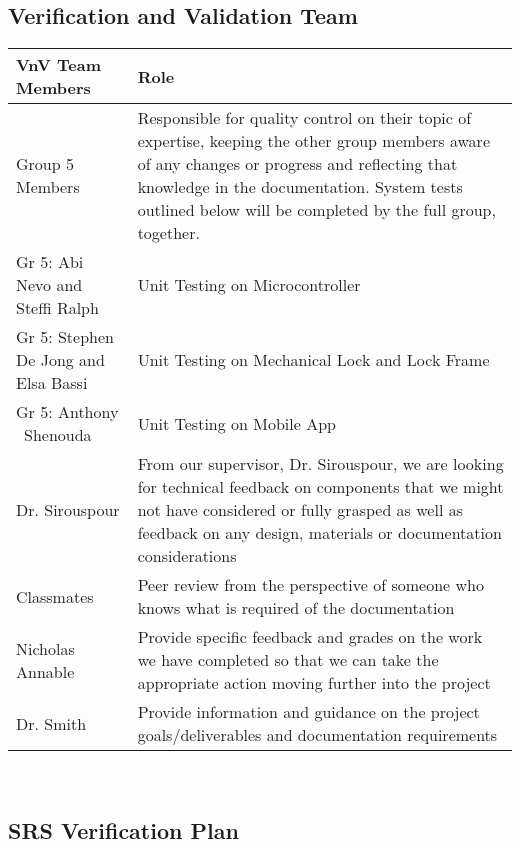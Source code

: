 \documentclass[12pt, titlepage]{article}
\begin{document}
\subsection{Verification and Validation Team}

 \begin{minipage}{\textwidth}
\renewcommand*{\arraystretch}{1.5}
\begin{tabular}{| p{} | p{} |}
 \hline
 VnV Team Members & Role \\ 
  \hline
 Group 5 Members & Responsible for quality control on their topic of expertise, keeping the other group members aware of any changes or progress and reflecting that knowledge in the documentation. System tests outlined below will be completed by the full group, together.\\ 
 \hline
Gr 5: Abi Nevo and Steffi Ralph & Unit Testing on Microcontroller \\ 
  \hline
Gr 5: Stephen De Jong and Elsa Bassi & Unit Testing on Mechanical Lock and Lock Frame \\ 
  \hline
  Gr 5: Anthony
  ~\newline Shenouda & Unit Testing on Mobile App \\ 
  \hline
   Dr. Sirouspour & From our supervisor, Dr. Sirouspour, we are looking for technical feedback on components that we might not have considered or fully grasped as well as feedback on any design, materials or documentation considerations\\
  \hline
    Classmates & Peer review from the perspective of someone who knows what is required of the documentation \\
  \hline
   Nicholas Annable & Provide specific feedback and grades on the work we have completed so that we can take the appropriate action moving further into the project\\
  \hline
  Dr. Smith & Provide information and guidance on the project goals/deliverables and documentation requirements \\
  \hline

\end{tabular}
\end{minipage}\\

\subsection{SRS Verification Plan}
\end{document}
